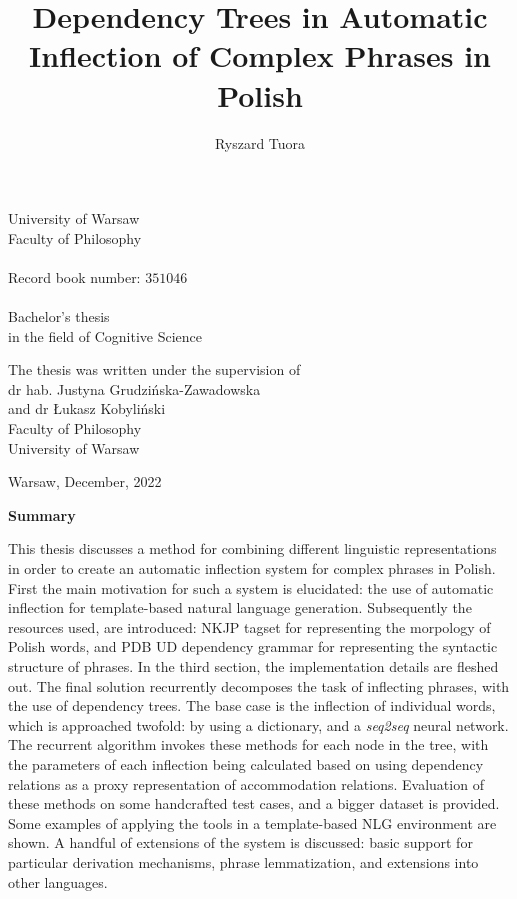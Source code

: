 \documentclass[12pt]{article}
\title{Dependency Trees in Automatic Inflection of Complex Phrases in Polish}
\author{Ryszard Tuora}
\date{}
\begin{document}
\begin{center}
\Large
University of Warsaw\\
Faculty of Philosophy\\
\vspace{\baselineskip}
\large
\theauthor\\
\normalsize
Record book number: $351046$\\
\LARGE
\vspace{2\baselineskip}
\thetitle \\
\vspace{2\baselineskip}
\normalsize
Bachelor's thesis\\
in the field of Cognitive Science\\
\end{center}
\vspace{5\baselineskip}
\begin{flushright}
The thesis was written under the supervision of\\
dr hab. Justyna Grudzińska-Zawadowska\\
and dr Łukasz Kobyliński\\
Faculty of Philosophy\\
University of Warsaw\\
\end{flushright}
\vspace{2\baselineskip}
\begin{center}
Warsaw, December, 2022
\end{center}
\pagebreak

\begin{center}
\textbf{Summary}
\end{center}

\noindent This thesis discusses a method for combining different linguistic representations in order to create an automatic inflection system for complex phrases in Polish. First the main motivation for such a system is elucidated: the use of automatic inflection for template-based natural language generation. Subsequently the resources used, are introduced: NKJP tagset for representing the morpology of Polish words, and PDB UD dependency grammar for representing the syntactic structure of phrases. In the third section, the implementation details are fleshed out. The final solution recurrently decomposes the task of inflecting phrases, with the use of dependency trees. The base case is the inflection of individual words, which is approached twofold: by using a dictionary, and a \textit{seq2seq} neural network. The recurrent algorithm invokes these methods for each node in the tree, with the parameters of each inflection being calculated based on using dependency relations as a proxy representation of accommodation relations. Evaluation of these methods on some handcrafted test cases, and a bigger dataset is provided. Some examples of applying the tools in a template-based NLG environment are shown. A handful of extensions of the system is discussed: basic support for particular derivation mechanisms, phrase lemmatization, and extensions into other languages.
\end{document}
